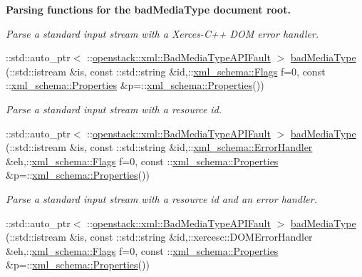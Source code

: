 \begin{Indent}{\bf Parsing functions for the badMediaType document root.}
\begin{DoxyCompactItemize}
\begin{DoxyCompactList}\small\item\em Parse a standard input stream with a Xerces-\/C++ DOM error handler. \item\end{DoxyCompactList}\item 
::std::auto\_\-ptr$<$ ::\hyperlink{classopenstack_1_1xml_1_1BadMediaTypeAPIFault}{openstack::xml::BadMediaTypeAPIFault} $>$ \hyperlink{namespaceopenstack_1_1xml_a1c4f1b770e86a6fff80387787ee917dc}{badMediaType} (::std::istream \&is, const ::std::string \&id,::\hyperlink{namespacexml__schema_affb4c227cbd9aa7453dd1dc5a1401943}{xml\_\-schema::Flags} f=0, const ::\hyperlink{namespacexml__schema_ad27ce19a7ee1d3b1064092648898f64c}{xml\_\-schema::Properties} \&p=::\hyperlink{namespacexml__schema_ad27ce19a7ee1d3b1064092648898f64c}{xml\_\-schema::Properties}())
\begin{DoxyCompactList}\small\item\em Parse a standard input stream with a resource id. \item\end{DoxyCompactList}\item 
::std::auto\_\-ptr$<$ ::\hyperlink{classopenstack_1_1xml_1_1BadMediaTypeAPIFault}{openstack::xml::BadMediaTypeAPIFault} $>$ \hyperlink{namespaceopenstack_1_1xml_a9d86f496dcea4d9cdefe04f06cee6007}{badMediaType} (::std::istream \&is, const ::std::string \&id,::\hyperlink{namespacexml__schema_ab1c9361bfd3b404eaabf0c31eded79dc}{xml\_\-schema::ErrorHandler} \&eh,::\hyperlink{namespacexml__schema_affb4c227cbd9aa7453dd1dc5a1401943}{xml\_\-schema::Flags} f=0, const ::\hyperlink{namespacexml__schema_ad27ce19a7ee1d3b1064092648898f64c}{xml\_\-schema::Properties} \&p=::\hyperlink{namespacexml__schema_ad27ce19a7ee1d3b1064092648898f64c}{xml\_\-schema::Properties}())
\begin{DoxyCompactList}\small\item\em Parse a standard input stream with a resource id and an error handler. \item\end{DoxyCompactList}\item 
::std::auto\_\-ptr$<$ ::\hyperlink{classopenstack_1_1xml_1_1BadMediaTypeAPIFault}{openstack::xml::BadMediaTypeAPIFault} $>$ \hyperlink{namespaceopenstack_1_1xml_ae3a280537039b4646ee36527e1ac680c}{badMediaType} (::std::istream \&is, const ::std::string \&id,::xercesc::DOMErrorHandler \&eh,::\hyperlink{namespacexml__schema_affb4c227cbd9aa7453dd1dc5a1401943}{xml\_\-schema::Flags} f=0, const ::\hyperlink{namespacexml__schema_ad27ce19a7ee1d3b1064092648898f64c}{xml\_\-schema::Properties} \&p=::\hyperlink{namespacexml__schema_ad27ce19a7ee1d3b1064092648898f64c}{xml\_\-schema::Properties}())

\end{DoxyCompactItemize}
\end{Indent}
